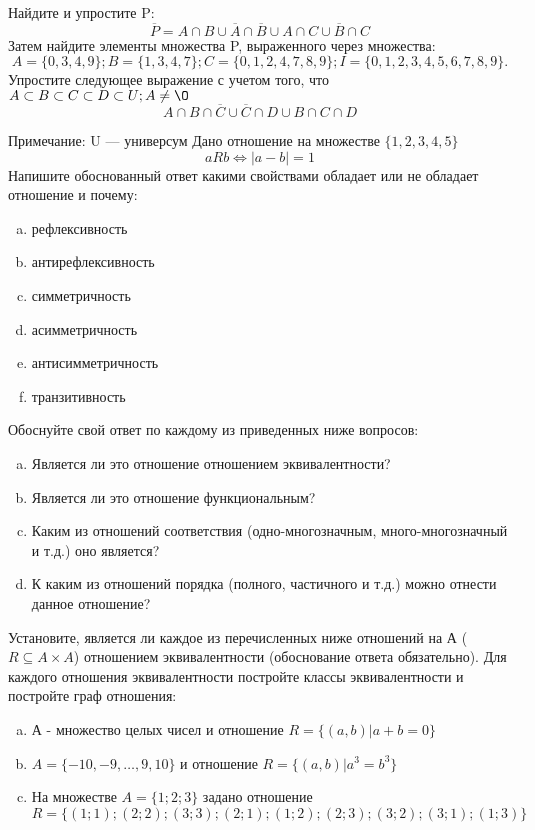 \documentclass[10pt]{exam}
\begin{document}
\begin{questions}
\question
Найдите и упростите P:
\begin{equation*}
\overline{P} = A \cap B \cup \overline{A} \cap \overline{B} \cup A \cap C \cup \overline{B} \cap C
\end{equation*}
Затем найдите элементы множества P, выраженного через множества:
\begin{equation*}
A = \{0, 3, 4, 9\}; 
B = \{1, 3, 4, 7\};
C = \{0, 1, 2, 4, 7, 8, 9\};
I = \{0, 1, 2, 3, 4, 5, 6, 7, 8, 9\}.
\end{equation*}\question
Упростите следующее выражение с учетом того, что $A\subset B \subset C \subset D \subset U; A \neq \O$
\begin{equation*}
A \cap B  \cap \overline{C} \cup \overline{C} \cap D \cup B \cap C \cap D
\end{equation*}

Примечание: U — универсум\question
Дано отношение на множестве $\{1, 2, 3, 4, 5\}$ 
\begin{equation*}
aRb \iff |a-b| = 1
\end{equation*}
Напишите обоснованный ответ какими свойствами обладает или не обладает отношение и почему:   
\begin{enumerate} [a)]\setcounter{enumi}{0}
\item рефлексивность
\item антирефлексивность
\item симметричность
\item асимметричность
\item антисимметричность
\item транзитивность
\end{enumerate}

Обоснуйте свой ответ по каждому из приведенных ниже вопросов:
\begin{enumerate} [a)]\setcounter{enumi}{0}
    \item Является ли это отношение отношением эквивалентности?
    \item Является ли это отношение функциональным?
    \item Каким из отношений соответствия (одно-многозначным, много-многозначный и т.д.) оно является?
    \item К каким из отношений порядка (полного, частичного и т.д.) можно отнести данное отношение?
\end{enumerate}

\question
Установите, является ли каждое из перечисленных ниже отношений на А ($R \subseteq A \times A$) отношением эквивалентности (обоснование ответа обязательно). Для каждого отношения эквивалентности 
постройте классы эквивалентности и постройте граф отношения:
\begin{enumerate}[a)]\setcounter{enumi}{0}
\item А - множество целых чисел и отношение $R = \{(a,b)|a + b = 0\}$
\item $A = \{-10, -9, …, 9, 10\}$ и отношение $R = \{(a,b)|a^{3} = b^{3}\}$
\item На множестве $A = \{1; 2; 3\}$ задано отношение $R = \{(1; 1); (2; 2); (3; 3); (2; 1); (1; 2); (2; 3); (3; 2); (3; 1); (1; 3)\}$


\end{enumerate}
\end{questions}
\end{document}
